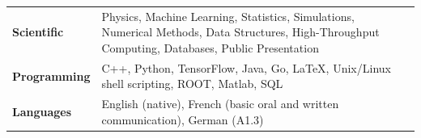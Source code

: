 \documentclass{letter}
\begin{document}

\begin{flushleft}
  \Large{\textsc{\textbf{\color{Maroon}{Skills}}}}
  \vspace{1pt}  %
\end{flushleft}

\begin{tabular}{p{}p{}}

  {\bf Scientific} 
  &
  Physics, Machine Learning, Statistics, Simulations, Numerical Methods, Data Structures, High-Throughput Computing, Databases, Public Presentation \newline
  \\

  {\bf Programming} 
  &
  C++, Python, TensorFlow, Java, Go, \LaTeX{}, Unix/Linux shell scripting, ROOT, Matlab, SQL \newline
  \\ 

  {\bf Languages}
  &
  English (native), French (basic oral and written communication), German (A1.3)
\end{tabular}



\begin{flushleft}
  \Large{\textsc{\textbf{\color{Maroon}{Volunteering \& Outreach}}}}
  \vspace{1pt}  %
\end{flushleft}
\vspace{-10pt}  %
\end{document}
